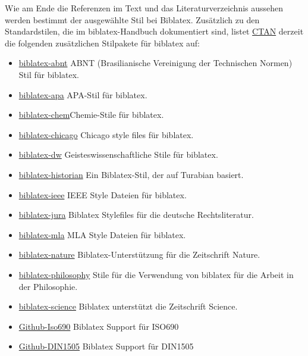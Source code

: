 Wie am Ende die Referenzen im Text und das Literaturverzeichnis aussehen werden bestimmt der ausgewählte Stil bei Biblatex. Zusätzlich zu den Standardstilen, die im biblatex-Handbuch dokumentiert sind, listet \href{http://ftp.fau.de/ctan/info/translations/biblatex/de/biblatex-de-Benutzerhandbuch.pdf}{CTAN} derzeit die folgenden zusätzlichen Stilpakete für biblatex auf:
\begin{itemize}
	\item  \href{https://ctan.org/pkg/biblatex-abnt}{biblatex-abnt}  ABNT (Brasilianische Vereinigung der Technischen Normen) Stil für biblatex.
	\item  \href{https://ctan.org/pkg/biblatex-apa}{biblatex-apa} APA-Stil für biblatex.
	\item  \href{https://ctan.org/pkg/biblatex-chem}{biblatex-chem}Chemie-Stile für biblatex.
	\item  \href{https://ctan.org/pkg/biblatex-chicago}{biblatex-chicago} Chicago style files für biblatex.
	\item  \href{https://ctan.org/pkg/biblatex-dw}{biblatex-dw} Geisteswissenschaftliche Stile für biblatex.
	\item  \href{https://ctan.org/pkg/biblatex-historian}{biblatex-historian} Ein Biblatex-Stil, der auf Turabian basiert.
	\item  \href{https://ctan.org/pkg/biblatex-ieee}{biblatex-ieee} IEEE Style Dateien für biblatex.
	\item  \href{https://ctan.org/pkg/biblatex-jura}{biblatex-jura} Biblatex Stylefiles für die deutsche Rechtsliteratur.
	\item  \href{https://ctan.org/pkg/biblatex-mla}{biblatex-mla} MLA Style Dateien für biblatex.
	\item  \href{https://ctan.org/pkg/biblatex-nature}{biblatex-nature} Biblatex-Unterstützung für die Zeitschrift Nature.
	\item  \href{https://ctan.org/pkg/biblatex-philosophy}{biblatex-philosophy} Stile für die Verwendung von biblatex für die Arbeit in der Philosophie.
	\item  \href{https://ctan.org/pkg/biblatex-science}{biblatex-science} Biblatex unterstützt die Zeitschrift Science.
	\item  \href{https://github.com/michal-h21/biblatex-iso690}{Github-Iso690} Biblatex Support für ISO690
	\item  \href{https://github.com/domhardt/BibLaTeX-DIN1505}{Github-DIN1505} Biblatex Support für DIN1505
\end{itemize}

